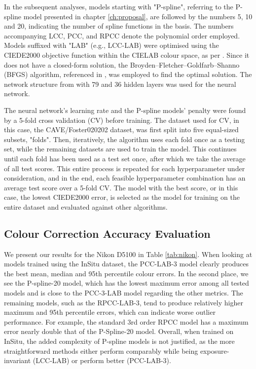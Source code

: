 In the subsequent analyses, models starting with "P-spline", referring to the P-spline model presented in chapter \ref{ch:proposal}, are followed by the numbers 5, 10 and 20, indicating the number of spline functions in the basis. The numbers accompanying LCC, PCC, and RPCC denote the polynomial order employed. Models suffixed with "LAB" (e.g., LCC-LAB) were optimised using the CIEDE2000 objective function within the CIELAB colour space, as per \cite{ciede2000math}. Since it does not have a closed-form solution, the Broyden–Fletcher–Goldfarb–Shanno (BFGS) algorithm, referenced in \cite{fletcher2000practical}, was employed to find the optimal solution. The network structure from \cite{macdonald2021camera} with 79 and 36 hidden layers was used for the neural network.

The neural network's learning rate and the P-spline models' penalty were found by a 5-fold cross validation (CV) before training. The dataset used for CV, in this case, the CAVE/Foster020202 dataset, was first split into five equal-sized subsets, "folds". Then, iteratively, the algorithm uses each fold once as a testing set, while the remaining datasets are used to train the model. This continues until each fold has been used as a test set once, after which we take the average of all test scores. This entire process is repeated for each hyperparameter under consideration, and in the end, each feasible hyperparameter combination has an average test score over a 5-fold CV. The model with the best score, or in this case, the lowest CIEDE2000 error, is selected as the model for training on the entire dataset and evaluated against other algorithms.

\subsection{Colour Correction Accuracy Evaluation}
 \label{ss:evaluation}

 We present our results for the Nikon D5100 in Table \ref{tab:nikon}.  When looking at models trained using the InSitu dataset, the PCC-LAB-3 model clearly produces the best mean, median and 95th percentile colour errors. In the second place, we see the P-spline-20 model, which has the lowest maximum error among all tested models and is close to the PCC-3-LAB model regarding the other metrics. The remaining models, such as the RPCC-LAB-3, tend to produce relatively higher maximum and 95th percentile errors, which can indicate worse outlier performance. For example, the standard 3rd order RPCC model has a maximum error nearly double that of the P-Spline-20 model. Overall, when trained on InSitu, the added complexity of P-spline models is not justified, as the more straightforward methods either perform comparably while being exposure-invariant (LCC-LAB) or perform better (PCC-LAB-3).

